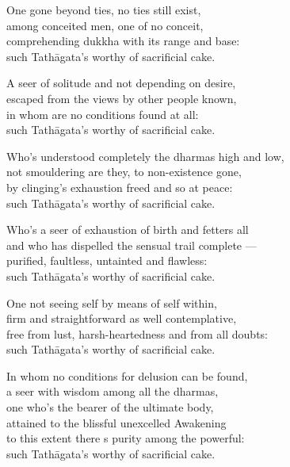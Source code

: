 \begin{MyDescription}{}
One gone beyond ties, no ties still exist,\\
among conceited men, one of no conceit,\\
comprehending dukkha with its range and base:\\
such Tath\=agata's worthy of sacrificial cake.
\end{MyDescription}

\begin{MyDescription}{}
A seer of solitude and not depending on desire,\\
escaped from the views by other people known,\\
in whom are no conditions found at all:\\
such Tath\=agata's worthy of sacrificial cake.
\end{MyDescription}

\begin{MyDescription}{}
Who's understood completely the dharmas high and low,\\
not smouldering are they, to non-existence gone,\\
by clinging's exhaustion freed and so at peace:\\
such Tath\=agata's worthy of sacrificial cake.
\end{MyDescription}

\begin{MyDescription}{}
Who's a seer of exhaustion of birth and fetters all\\
and who has dispelled the sensual trail complete —\\
purified, faultless, untainted and ﬂawless:\\
such Tath\=agata's worthy of sacrificial cake.
\end{MyDescription}

\begin{MyDescription}{}
One not seeing self by means of self within,\\
firm and straightforward as well contemplative,\\
free from lust, harsh-heartedness and from all doubts:\\
such Tath\=agata's worthy of sacrificial cake.
\end{MyDescription}

\begin{MyDescription}{}
In whom no conditions for delusion can be found,\\
a seer with wisdom among all the dharmas,\\
one who's the bearer of the ultimate body,\\
attained to the blissful unexcelled Awakening\\
to this extent there s purity among the powerful:\\
such Tath\=agata's worthy of sacrificial cake.
\end{MyDescription}

